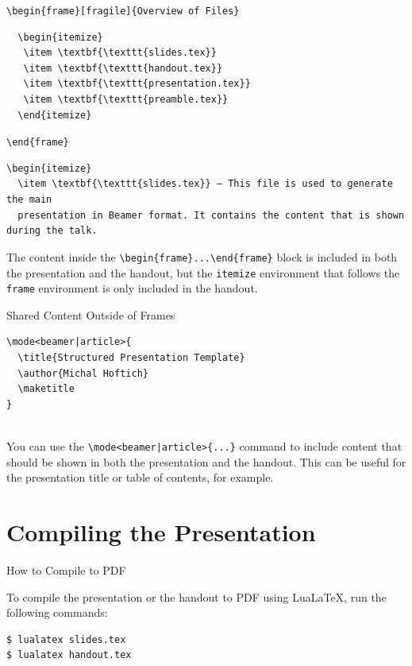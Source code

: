 \verb|\begin|\verb|{frame}[fragile]{Overview of Files}|
\begin{verbatim}
  \begin{itemize}
   \item \textbf{\texttt{slides.tex}} 
   \item \textbf{\texttt{handout.tex}}
   \item \textbf{\texttt{presentation.tex}}
   \item \textbf{\texttt{preamble.tex}}
  \end{itemize}
\end{verbatim}
\verb|\end|\verb|{frame}|
\begin{verbatim}
\begin{itemize}
  \item \textbf{\texttt{slides.tex}} – This file is used to generate the main 
  presentation in Beamer format. It contains the content that is shown during the talk.
\end{verbatim}

The content inside the \verb|\begin|\verb|{frame}...\end|\verb|{frame}| block is included in both
the presentation and the handout, but the \texttt{itemize} environment that follows
the \verb|frame| environment is only included in the handout.


\begin{frame}[fragile]{Shared Content Outside of Frames}

\begin{verbatim}
\mode<beamer|article>{
  \title{Structured Presentation Template}
  \author{Michal Hoftich}
  \maketitle
}
  
\end{verbatim}
\end{frame}

You can use the \verb+\mode<beamer|article>{...}+ command to include content that should be
shown in both the presentation and the handout. This can be useful for
the presentation title or table of contents, for example.




\section{Compiling the Presentation}

\begin{frame}[fragile]{How to Compile to PDF} 

To compile the presentation or the handout to PDF using LuaLaTeX, run the following commands:

\begin{verbatim}
$ lualatex slides.tex
$ lualatex handout.tex
\end{verbatim}
\end{frame}

